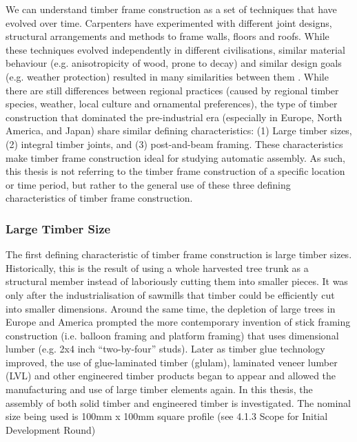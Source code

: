 We can understand timber frame construction as a set of techniques that have evolved over time. Carpenters have experimented with different joint designs, structural arrangements and methods to frame walls, floors and roofs. While these techniques evolved independently in different civilisations, similar material behaviour (e.g. anisotropicity of wood, prone to decay) and similar design goals (e.g. weather protection) resulted in many similarities between them \parencite{zwergerWoodWoodJoints2012}.
While there are still differences between regional practices (caused by regional timber species, weather, local culture and ornamental preferences), the type of timber construction that dominated the pre-industrial era (especially in Europe, North America, and Japan) share similar defining characteristics: (1) Large timber sizes, (2) integral timber joints, and (3) post-and-beam framing. 
These characteristics make timber frame construction ideal for studying automatic assembly.
As such, this thesis is not referring to the timber frame construction of a specific location or time period, but rather to the general use of these three defining characteristics of timber frame construction.

\subsubsection{Large Timber Size}
\label{subsec:timberframeconstruction/largetimbersize}

The first defining characteristic of timber frame construction is large timber sizes.
Historically, this is the result of using a whole harvested tree trunk as a structural member instead of laboriously cutting them into smaller pieces.
It was only after the industrialisation of sawmills that timber could be efficiently cut into smaller dimensions.
Around the same time, the depletion of large trees in Europe and America prompted the more contemporary invention of stick framing construction (i.e. balloon framing and platform framing) that uses dimensional lumber (e.g. 2x4 inch “two-by-four” studs). Later as timber glue technology improved, the use of glue-laminated timber (glulam), laminated veneer lumber (LVL) and other engineered timber products began to appear and allowed the manufacturing and use of large timber elements again.
In this thesis, the assembly of both solid timber and engineered timber is investigated.
The nominal size being used is 100mm x 100mm square profile (see 4.1.3 Scope for Initial Development Round)

